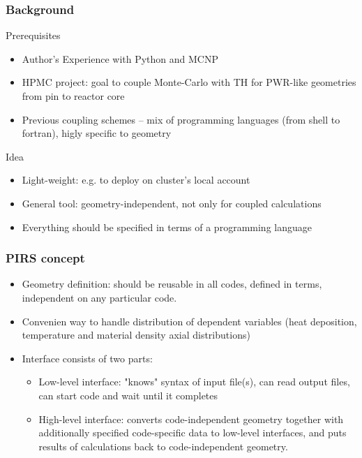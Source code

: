 \begin{frame}\frametitle{Background}
    \begin{block}{Prerequisites}
    \begin{itemize}
        \item Author's Experience with Python and MCNP 
        \item HPMC project: goal to couple Monte-Carlo with TH for PWR-like geometries from pin to reactor core
        \item Previous coupling schemes -- mix of programming languages (from shell to fortran), higly specific to geometry
    \end{itemize}
    \end{block}

    \begin{block}{Idea}
    \begin{itemize}
        \item Light-weight: e.g. to deploy on cluster's local account
        \item General tool: geometry-independent, not only for coupled calculations
        \item Everything should be specified in terms of a programming language
    \end{itemize}
    \end{block}
\end{frame}

\begin{frame}\frametitle{PIRS concept}

    \begin{itemize}
        \item Geometry definition: should be reusable in all codes, defined in terms, independent on any particular code.

        \item Convenien way to handle distribution of dependent variables (heat deposition, temperature and material density axial distributions)

        \item Interface consists of two parts:
            \begin{itemize}
                \item Low-level interface: "knows" syntax of input file(s), can read output files, can start code and wait until it completes
                \item High-level interface: converts code-independent geometry together with additionally specified code-specific data to low-level interfaces, and puts results of
                      calculations back to code-independent geometry.
            \end{itemize}
    \end{itemize}
\end{frame}


